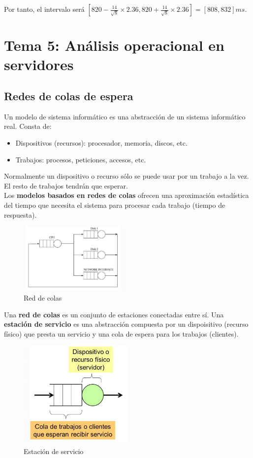 \documentclass[12pt,spanish]{article}
\begin{document}
Por tanto, el intervalo será $	[820-\frac{14}{\sqrt{8}} \times 2.36, 820+\frac{14}{\sqrt{8}} \times 2.36] = [808,832]ms$.
\newpage
\section{Tema 5: Análisis operacional en servidores}

\subsection{Redes de colas de espera}

Un modelo de sistema informático es una abstracción de un sistema informático real. Consta de:
\begin{itemize}
	\item Dispositivos (recursos): procesador, memoria, discos, etc.
	\item Trabajos: procesos, peticiones, accesos, etc.
\end{itemize}

Normalmente un dispositivo o recurso sólo se puede usar por un trabajo a la vez. El resto de trabajos tendrán que esperar.\\

Los \textbf{modelos basados en redes de colas} ofrecen una aproximación estadística del tiempo que necesita el sistema para procesar cada trabajo (tiempo de respuesta).

\begin{figure}[H]
	\centering
	\includegraphics[width=0.5\textwidth]{redcolas.png}
	\caption{Red de colas}
\end{figure}

Una \textbf{red de colas} es un conjunto de estaciones conectadas entre sí. Una \textbf{estación de servicio} es una abstracción compuesta por un dispoisitivo (recurso físico) que presta un servicio y una cola de espera para los trabajos (clientes).

\begin{figure}[H]
	\centering
	\includegraphics[width=0.5\textwidth]{estserv.png}
	\caption{Estación de servicio}
\end{figure}
\end{document}
